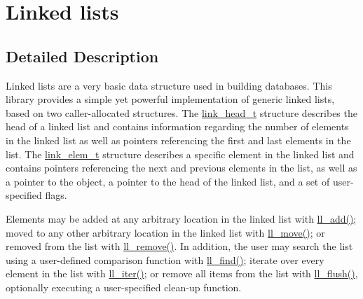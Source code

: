 \hypertarget{group__dbprim__link}{
\section{Linked lists}
\label{group__dbprim__link}
}


\subsection{Detailed Description}
Linked lists are a very basic data structure used in building databases. This library provides a simple yet powerful implementation of generic linked lists, based on two caller-allocated structures. The \hyperlink{group__dbprim__link_a0}{link\_\-head\_\-t} structure describes the head of a linked list and contains information regarding the number of elements in the linked list as well as pointers referencing the first and last elements in the list. The \hyperlink{group__dbprim__link_a1}{link\_\-elem\_\-t} structure describes a specific element in the linked list and contains pointers referencing the next and previous elements in the list, as well as a pointer to the object, a pointer to the head of the linked list, and a set of user-specified flags.

Elements may be added at any arbitrary location in the linked list with \hyperlink{group__dbprim__link_a6}{ll\_\-add()}; moved to any other arbitrary location in the linked list with \hyperlink{group__dbprim__link_a7}{ll\_\-move()}; or removed from the list with \hyperlink{group__dbprim__link_a8}{ll\_\-remove()}. In addition, the user may search the list using a user-defined comparison function with \hyperlink{group__dbprim__link_a9}{ll\_\-find()}; iterate over every element in the list with \hyperlink{group__dbprim__link_a10}{ll\_\-iter()}; or remove all items from the list with \hyperlink{group__dbprim__link_a11}{ll\_\-flush()}, optionally executing a user-specified clean-up function. 

